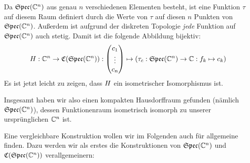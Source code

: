 Da $\mathfrak{Spec}(\mathbb{C}^n)$ aus genau $n$ verschiedenen Elementen besteht, ist eine Funktion $\tau$ auf diesem Raum definiert durch die Werte von $\tau$ auf diesen $n$ Punkten von $\mathfrak{Spec}(\mathbb{C}^n)$. Außerdem ist aufgrund der diskreten Topologie \emph{jede} Funktion auf $\mathfrak{Spec}(\mathbb{C}^n)$ auch stetig. Damit ist die folgende Abbildung bijektiv:
	\[H: \mathbb{C}^n  \to \mathfrak{C}(\mathfrak{Spec}(\mathbb{C}^n)): \left(\begin{matrix} c_1 \\ \vdots \\ c_n \end{matrix}\right) \mapsto (\tau_c: \mathfrak{Spec}(\mathbb{C}^n) \to \mathbb{C}: f_k \mapsto c_k) \]
Es ist jetzt leicht zu zeigen, dass $H$ ein isometrischer Isomorphismus ist.

Insgesamt haben wir also einen kompakten Hausdorffraum gefunden (nämlich $\mathfrak{Spec}(\mathbb{C}^n)$), dessen Funktionenraum isometrisch isomorph zu unserer ursprünglichen \CAlg{} $\mathbb{C}^n$ ist.

Eine vergleichbare Konstruktion wollen wir im Folgenden auch für allgemeine \CAlgn{} finden. Dazu werden wir als erstes die Konstruktionen von $\mathfrak{Spec}(\mathbb{C}^n)$ und $\mathfrak{C}(\mathfrak{Spec}(\mathbb{C}^n))$ verallgemeinern: